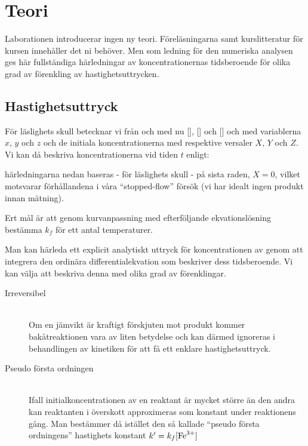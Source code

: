 \section{Teori}
\label{sec:teori}
Laborationen introducerar ingen ny teori. Föreläsningarna samt
kurslitteratur för kursen innehåller det ni behöver. Men som ledning för
den numeriska analysen ges här fullständiga härledningar av
koncentrationernas tidsberoende för olika grad av förenkling av
hastighetsuttrycken.

\subsection{Hastighetsuttryck}
För läslighets skull betecknar vi från och med nu [],
[] och [] och med variablerna $x$, $y$ och $z$ och de
initiala koncentrationerna med respektive versaler $X$, $Y$ och $Z$. Vi
kan då beskriva koncentrationerna vid tiden $t$ enligt:



härledningarna nedan baseras - för läslighets skull - på sista raden,
$X=0$, vilket motsvarar förhållandena i våra ``stopped-flow'' försök (vi har
idealt ingen produkt innan mätning).

Ert mål är att genom kurvanpassning med efterföljande ekvationslösning
bestämma $k_f$ för ett antal temperaturer.

Man kan härleda ett explicit analytiskt uttryck för koncentrationen
av  genom att integrera den ordinära differentialekvation
som beskriver dess tidsberoende. Vi kan välja att beskriva denna med
olika grad av förenklingar.
\begin{description}
\item[Irreversibel] \hfill \\
  Om en jämvikt är kraftigt förskjuten mot produkt kommer
  bakåtreaktionen vara av liten betydelse och kan därmed
  ignoreras i behandlingen av kinetiken för att få
  ett enklare hastighetsuttryck.
\item[Pseudo första ordningen] \hfill \\ %
  Ifall initialkoncentrationen av en reaktant är mycket större än den andra
  kan reaktanten i överskott approximeras som konstant under reaktionens
  gång. Man bestämmer då istället den så kallade ``pseudo första ordningens''
  hastighets konstant $k' = k_f[\ce{Fe^3+}]$
\end{description}



